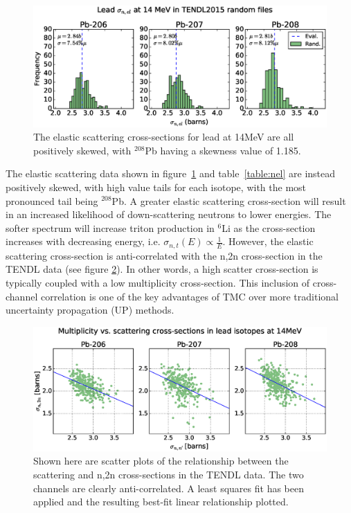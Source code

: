 \begin{figure}[H]
  \includegraphics[width=\textwidth]{pb_tendl_nel_hist}
  \caption{The elastic scattering cross-sections for lead at 14MeV are all positively skewed, with $^{208}$Pb having a skewness value of 1.185.}
  \label{fig:tendl_nel}
\end{figure}

The elastic scattering data shown in figure~\ref{fig:tendl_nel} and table~\ref{table:nel} are instead positively skewed, with high value tails for each isotope, with the most pronounced tail being $^{208}$Pb. A greater elastic scattering cross-section will result in an increased likelihood of down-scattering neutrons to lower energies. The softer spectrum will increase triton production in $^{6}$Li as the cross-section increases with decreasing energy, i.e. $\sigma_{n,t}(E) \propto \frac{1}{E}$. However, the elastic scattering cross-section is anti-correlated with the n,2n cross-section in the TENDL data (see figure \ref{fig:pb_el_n2n_corr}). In other words, a high scatter cross-section is typically coupled with a low multiplicity cross-section. This inclusion of cross-channel correlation is one of the key advantages of TMC over more traditional uncertainty propagation (UP) methods. 


\begin{figure}[H]
	\includegraphics[width=\textwidth]{pb_el_n2n_corr}
  \caption{Shown here are scatter plots of the relationship between the scattering and n,2n cross-sections in the TENDL data. The two channels are clearly anti-correlated. A least squares fit has been applied and the resulting best-fit linear relationship plotted.}
	\label{fig:pb_el_n2n_corr}
\end{figure}

